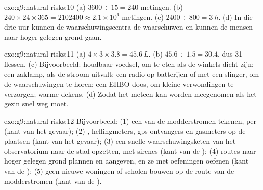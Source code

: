 \begin{solution}{exo:g9:natural-risks:10}
(a) $3600 \div 15 = 240$ metingen. (b) $240 \times 24 \times 365 =
\num{2102400} \approx 2.1 \times 10^6$ metingen. (c) $2400 \div 800 =
\qty{3}{h}$. (d) In die drie uur kunnen de waarschuwingscentra de 
waarschuwen en kunnen de mensen naar hoger gelegen grond gaan.
\end{solution}

\begin{solution}{exo:g9:natural-risks:11}
(a) $4 \times 3 \times 3.8 = \qty{45.6}{L}$. (b) $45.6 \div 1.5 = 30.4$,
dus 31 flessen. (c) Bijvoorbeeld: houdbaar voedsel, om te eten als de
winkels dicht zijn; een zaklamp, als de stroom uitvalt; een radio op
batterijen of met een slinger, om de waarschuwingen te horen; een
EHBO-doos, om kleine verwondingen te verzorgen; warme dekens. (d) Zodat
het meteen kan worden meegenomen als het gezin snel weg moet.
\end{solution}

\begin{solution}{exo:g9:natural-risks:12}
Bijvoorbeeld: (1) een  van de modderstromen tekenen,  per
 (kant van het gevaar); (2) , hellingmeters,
gps-ontvangers en gasmeters op de  plaatsen (kant van het gevaar);
(3) een snelle waarschuwingsketen van het observatorium naar de stad
opzetten, met sirenes (kant van de ); (4) routes naar hoger
gelegen grond plannen en aangeven, en ze met oefeningen oefenen (kant van
de ); (5) geen nieuwe woningen of scholen bouwen op de route
van de modderstromen (kant van de ).
\end{solution}

